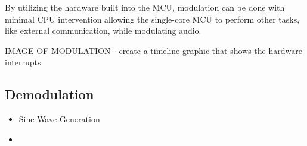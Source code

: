 \documentclass{journal}
\begin{document}
By utilizing the hardware built into the MCU, modulation can be done with minimal CPU intervention allowing the single-core MCU to perform other tasks, like external communication, while modulating audio.

IMAGE OF MODULATION - create a timeline graphic that shows the hardware interrupts

\subsection{Demodulation}



\begin{itemize}
  \item Sine Wave Generation
  \item 
\end{itemize}
\end{document}

